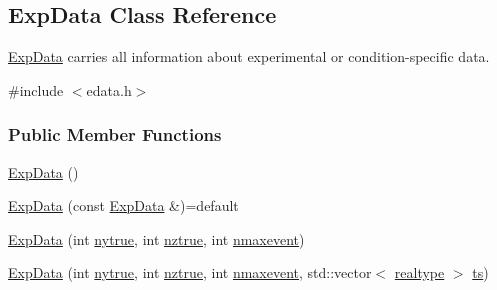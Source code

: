 \hypertarget{classamici_1_1_exp_data}{}\subsection{Exp\+Data Class Reference}
\label{classamici_1_1_exp_data}


\mbox{\hyperlink{classamici_1_1_exp_data}{Exp\+Data}} carries all information about experimental or condition-\/specific data.  




{\ttfamily \#include $<$edata.\+h$>$}

\subsubsection*{Public Member Functions}
\begin{DoxyCompactItemize}
\item 
\mbox{\hyperlink{classamici_1_1_exp_data_a19c9736cc55da621d8de182a76cc1e8f}{Exp\+Data}} ()
\item 
\mbox{\hyperlink{classamici_1_1_exp_data_a74a4a08956d260ee4a1b8f701564496d}{Exp\+Data}} (const \mbox{\hyperlink{classamici_1_1_exp_data}{Exp\+Data}} \&)=default
\item 
\mbox{\hyperlink{classamici_1_1_exp_data_af2322d528ad31a4335b0e5178b373649}{Exp\+Data}} (int \mbox{\hyperlink{classamici_1_1_exp_data_ac2657ffc58ee1ea80d6c4db40010e942}{nytrue}}, int \mbox{\hyperlink{classamici_1_1_exp_data_a9e9b6341842d8860b0114faa4e0c97ee}{nztrue}}, int \mbox{\hyperlink{classamici_1_1_exp_data_ae6996d31ed94180a4b1d79412eb5ce31}{nmaxevent}})
\item 
\mbox{\hyperlink{classamici_1_1_exp_data_aa12ccb639686521566169ee3b62ab0ef}{Exp\+Data}} (int \mbox{\hyperlink{classamici_1_1_exp_data_ac2657ffc58ee1ea80d6c4db40010e942}{nytrue}}, int \mbox{\hyperlink{classamici_1_1_exp_data_a9e9b6341842d8860b0114faa4e0c97ee}{nztrue}}, int \mbox{\hyperlink{classamici_1_1_exp_data_ae6996d31ed94180a4b1d79412eb5ce31}{nmaxevent}}, std\+::vector$<$ \mbox{\hyperlink{namespaceamici_a1bdce28051d6a53868f7ccbf5f2c14a3}{realtype}} $>$ \mbox{\hyperlink{classamici_1_1_exp_data_aa7014a80e7b102f85a10e3b9a480e8e5}{ts}})
\item 

\end{DoxyCompactItemize}
